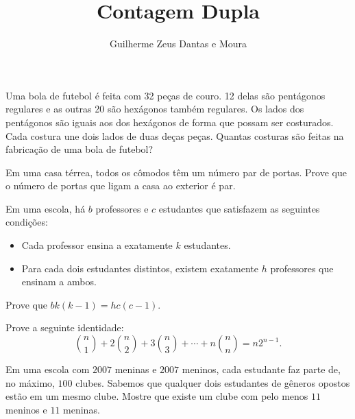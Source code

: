 \documentclass[10pt, a4paper]{article}
\title{Contagem Dupla}
\author{Guilherme Zeus Dantas e Moura}
\begin{document}
	
	\zeustitle

	\begin{prob} %
		Uma bola de futebol é feita com 32 peças de couro. 12 delas são pentágonos regulares e as outras 20 são hexágonos também regulares. Os lados dos pentágonos são iguais aos dos hexágonos de forma que possam ser costurados. Cada costura une dois lados de duas deças peças. Quantas costuras são feitas na fabricação de uma bola de futebol?
	\end{prob}

	\begin{prob} %
		Em uma casa térrea, todos os cômodos têm um número par de portas. Prove que o número de portas que ligam a casa ao exterior é par.	
	\end{prob}

	\begin{prob} %
		Em uma escola, há $b$ professores e $c$ estudantes que satisfazem as seguintes condições:
		
		\begin{itemize}
			\item Cada professor ensina a exatamente $k$ estudantes.
			\item Para cada dois estudantes distintos, existem exatamente $h$ professores que ensinam a ambos.
		\end{itemize}

		Prove que $bk(k-1) = hc(c-1)$.
	\end{prob}

	\begin{prob} %
		Prove a seguinte identidade: \[\binom{n}{1} + 2 \binom{n}{2} + 3 \binom{n}{3} + \cdots + n\binom{n}{n} = n2^{n-1}.\]
	\end{prob}

	\begin{prob}
		Em uma escola com $2007$ meninas e $2007$ meninos, cada estudante faz parte de, no máximo, $100$ clubes. Sabemos que qualquer dois estudantes de gêneros opostos estão em um mesmo clube. Mostre que existe um clube com pelo menos $11$ meninos e $11$ meninas.
	\end{prob}

\end{document}
